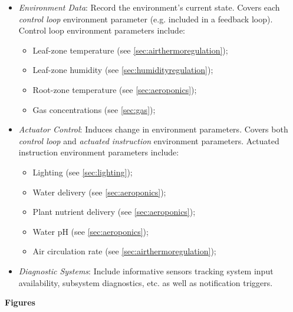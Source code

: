 \begin{itemize}
    \item \textit{Environment Data}: Record the environment's current state. Covers each \textit{control loop} environment parameter (e.g. included in a feedback loop). Control loop environment parameters include:
    \begin{itemize}
        \item Leaf-zone temperature (see \ref{sec:airthermoregulation});
        \item Leaf-zone humidity (see \ref{sec:humidityregulation});
        \item Root-zone temperature (see \ref{sec:aeroponics});
        \item Gas concentrations (see \ref{sec:gas});
    \end{itemize}
    \item \textit{Actuator Control}: Induces change in environment parameters. Covers both \textit{control loop} and \textit{actuated instruction} environment parameters. Actuated instruction environment parameters include:
    \begin{itemize}
        \item Lighting (see \ref{sec:lighting});
        \item Water delivery (see \ref{sec:aeroponics});
        \item Plant nutrient delivery (see \ref{sec:aeroponics});
        \item Water pH (see \ref{sec:aeroponics});
        \item Air circulation rate (see \ref{sec:airthermoregulation});
    \end{itemize}
    \item \textit{Diagnostic Systems}: Include informative sensors tracking system input availability, subsystem diagnostics, etc. as well as notification triggers.
\end{itemize}

\clearpage

\textbf{Figures}

